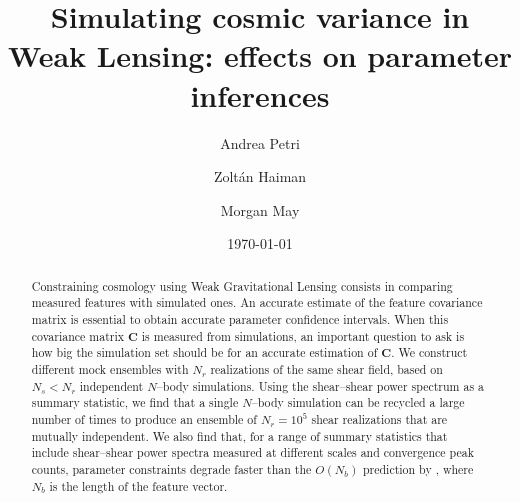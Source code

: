 \documentclass[reprint,aps,prd,superscriptaddress,showkeys,showpacs]{revtex4-1}
\newcommand{\bb}[1]{\mathbf{#1}}
\begin{document}
\title{Simulating cosmic variance in Weak Lensing: effects on parameter inferences}

\author{Andrea Petri}

\author{Zolt\'an Haiman}

\author{Morgan May}

\date{\today}

\label{firstpage}

\begin{abstract}
Constraining cosmology using Weak Gravitational Lensing consists in comparing measured features with simulated ones. An accurate estimate of the feature covariance matrix is essential to obtain accurate parameter confidence intervals. When this covariance matrix $\bb{C}$ is measured from simulations, an important question to ask is how big the simulation set should be for an accurate estimation of $\bb{C}$. We construct different mock ensembles with $N_r$ realizations of the same shear field, based on $N_s<N_r$ independent $N$--body simulations. Using the shear--shear power spectrum as a summary statistic, we find that a single $N$--body simulation can be recycled a large number of times to produce an ensemble of $N_r=10^5$ shear realizations that are mutually independent. We also find that, for a range of summary statistics that include shear--shear power spectra measured at different scales and convergence peak counts, parameter constraints degrade faster than the $O(N_b)$ prediction by \citep{DodelsonSchneider13}, where $N_b$ is the length of the feature vector.       
\end{abstract}



\maketitle


\end{document}
